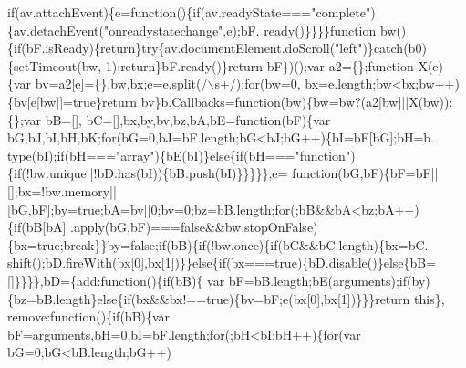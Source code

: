 \begin{DoxyCode}
{      if}(av.attachEvent)\{e=\textcolor{keyword}{function}()\{\textcolor{keywordflow}{if}(av.readyState===\textcolor{stringliteral}{"complete"})\{av.detachEvent(\textcolor{stringliteral}{"onreadystatechange"},e);bF.
      ready()\}\}\}\}\textcolor{keyword}{function} bw()\{\textcolor{keywordflow}{if}(bF.isReady)\{\textcolor{keywordflow}{return}\}\textcolor{keywordflow}{try}\{av.documentElement.doScroll(\textcolor{stringliteral}{"left"})\}\textcolor{keywordflow}{catch}(b0)\{setTimeout(bw,
      1);\textcolor{keywordflow}{return}\}bF.ready()\}\textcolor{keywordflow}{return} bF\})();var a2=\{\};\textcolor{keyword}{function} X(e)\{var bv=a2[e]=\{\},bw,bx;e=e.split(/\(\backslash\)s+/);\textcolor{keywordflow}{for}(bw=0,
      bx=e.length;bw<bx;bw++)\{bv[e[bw]]=\textcolor{keyword}{true}\}\textcolor{keywordflow}{return} bv\}b.Callbacks=\textcolor{keyword}{function}(bw)\{bw=bw?(a2[bw]||X(bw)):\{\};var bB=[],
      bC=[],bx,by,bv,bz,bA,bE=\textcolor{keyword}{function}(bF)\{var bG,bJ,bI,bH,bK;\textcolor{keywordflow}{for}(bG=0,bJ=bF.length;bG<bJ;bG++)\{bI=bF[bG];bH=b.
      type(bI);\textcolor{keywordflow}{if}(bH===\textcolor{stringliteral}{"array"})\{bE(bI)\}\textcolor{keywordflow}{else}\{\textcolor{keywordflow}{if}(bH===\textcolor{stringliteral}{"function"})\{\textcolor{keywordflow}{if}(!bw.unique||!bD.has(bI))\{bB.push(bI)\}\}\}\}\},e=\textcolor{keyword}{
      function}(bG,bF)\{bF=bF||[];bx=!bw.memory||[bG,bF];by=\textcolor{keyword}{true};bA=bv||0;bv=0;bz=bB.length;\textcolor{keywordflow}{for}(;bB&&bA<bz;bA++)\{\textcolor{keywordflow}{if}(bB[bA]
      .apply(bG,bF)===\textcolor{keyword}{false}&&bw.stopOnFalse)\{bx=\textcolor{keyword}{true};\textcolor{keywordflow}{break}\}\}by=\textcolor{keyword}{false};\textcolor{keywordflow}{if}(bB)\{\textcolor{keywordflow}{if}(!bw.once)\{\textcolor{keywordflow}{if}(bC&&bC.length)\{bx=bC.
      shift();bD.fireWith(bx[0],bx[1])\}\}\textcolor{keywordflow}{else}\{\textcolor{keywordflow}{if}(bx===\textcolor{keyword}{true})\{bD.disable()\}\textcolor{keywordflow}{else}\{bB=[]\}\}\}\},bD=\{add:\textcolor{keyword}{function}()\{\textcolor{keywordflow}{if}(bB)\{
      var bF=bB.length;bE(arguments);\textcolor{keywordflow}{if}(by)\{bz=bB.length\}\textcolor{keywordflow}{else}\{\textcolor{keywordflow}{if}(bx&&bx!==\textcolor{keyword}{true})\{bv=bF;e(bx[0],bx[1])\}\}\}\textcolor{keywordflow}{return} \textcolor{keyword}{this}\},\textcolor{keyword}{
      remove}:\textcolor{keyword}{function}()\{\textcolor{keywordflow}{if}(bB)\{var bF=arguments,bH=0,bI=bF.length;\textcolor{keywordflow}{for}(;bH<bI;bH++)\{\textcolor{keywordflow}{for}(var bG=0;bG<bB.length;bG++)

\end{DoxyCode}
